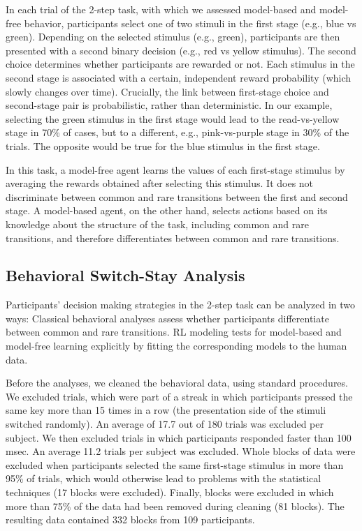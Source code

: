 \documentclass[11pt]{article} %
\begin{document}
In each trial of the 2-step task, with which we assessed model-based and model-free behavior, participants select one of two stimuli in the first stage (e.g., blue vs green). Depending on the selected stimulus (e.g., green), participants are then presented with a second binary decision (e.g., red vs yellow stimulus). The second choice determines whether participants are rewarded or not. Each stimulus in the second stage is associated with a certain, independent reward probability (which slowly changes over time). Crucially, the link between first-stage choice and second-stage pair is probabilistic, rather than deterministic. In our example, selecting the green stimulus in the first stage would lead to the read-vs-yellow stage in 70\% of cases, but to a different, e.g., pink-vs-purple stage in 30\% of the trials. The opposite would be true for the blue stimulus in the first stage.

In this task, a model-free agent learns the values of each first-stage stimulus by averaging the rewards obtained after selecting this stimulus. It does not discriminate between common and rare transitions between the first and second stage. A model-based agent, on the other hand, selects actions based on its knowledge about the structure of the task, including common and rare transitions, and therefore differentiates between common and rare transitions.

\subsection{Behavioral Switch-Stay Analysis}
Participants' decision making strategies in the 2-step task can be analyzed in two ways: Classical behavioral analyses assess whether participants differentiate between common and rare transitions. RL modeling tests for model-based and model-free learning explicitly by fitting the corresponding models to the human data.

Before the analyses, we cleaned the behavioral data, using standard procedures. We excluded trials, which were part of a streak in which participants pressed the same key more than 15 times in a row (the presentation side of the stimuli switched randomly). An average of 17.7 out of 180 trials was excluded per subject. We then excluded trials in which participants responded faster than 100 msec. An average 11.2 trials per subject was excluded. Whole blocks of data were excluded when participants selected the same first-stage stimulus in more than 95\% of trials, which would otherwise lead to problems with the statistical techniques (17 blocks were excluded). Finally, blocks were excluded in which more than 75\% of the data had been removed during cleaning (81 blocks). The resulting data contained 332 blocks from 109 participants.
\end{document}
